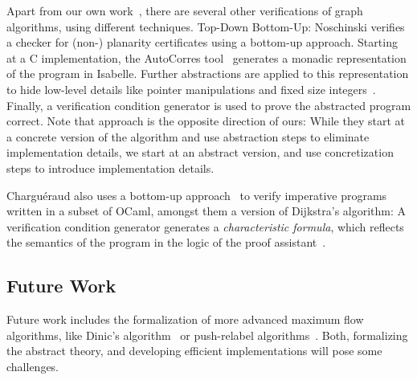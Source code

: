 \documentclass{llncs}
\begin{document}
  Apart from our own work~\cite{La14,NoLa12}, there are several other verifications of graph algorithms, using different techniques. 
  Top-Down
  Bottom-Up: Noschinski verifies a checker for (non-) planarity certificates using a bottom-up approach. Starting at a C implementation,
  the AutoCorres tool~\cite{AutoCorres. What's the standard paper on it?} generates a monadic representation of the program in Isabelle. Further abstractions are applied
  to this representation to hide low-level details like pointer manipulations and fixed size integers~\cite{AutoCorres-Mind-the-Gap}. Finally, a verification condition
  generator is used to prove the abstracted program correct. Note that approach is the opposite direction of ours: While they start at a concrete version of the algorithm and use abstraction steps to eliminate implementation details, we start at an abstract version, and use concretization steps to introduce implementation details.

  Chargu\'eraud also uses a bottom-up approach~\cite{char11} to verify imperative programs written in a subset of OCaml, amongst them a version of Dijkstra's algorithm:
  A verification condition generator generates a \emph{characteristic formula}, which reflects the semantics of the program in the logic of the proof assistant~\cite{}.
  
  \subsection{Future Work}
  Future work includes the formalization of more advanced maximum flow algorithms, like Dinic's algorithm~\cite{Di06} or push-relabel algorithms~\cite{GoTa88}.
  Both, formalizing the abstract theory, and developing efficient implementations will pose some challenges.
  
\end{document}
